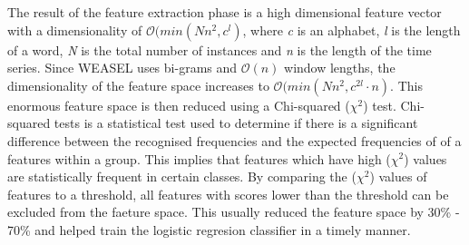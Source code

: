 The result of the feature extraction phase is a high dimensional feature vector with a dimensionality of \emph{$\mathcal{O}(min(Nn^{2},c^{l})$},
where \emph{c} is an alphabet, \emph{l} is the length of a word, \emph{N} is the total number of instances and \emph{n} is the length of the time series.
Since WEASEL uses bi-grams and \emph{$\mathcal{O}(n)$} window lengths, the dimensionality of the feature space increases to \emph{$\mathcal{O}(min(Nn^{2},c^{2l} \cdot n)$}.
This enormous feature space is then reduced using a Chi-squared ($\chi^{2}$) test. Chi-squared tests is a statistical test used to determine if there is a significant difference
between the recognised frequencies and the expected frequencies of of a features within a group. This implies that features which have high ($\chi^{2}$) values are statistically
frequent in certain classes. By comparing the ($\chi^{2}$) values of features to a threshold, all features with scores lower than the threshold can be excluded from the faeture space.
This usually reduced the feature space by 30\% - 70\% and helped train the logistic regresion classifier in a timely manner.